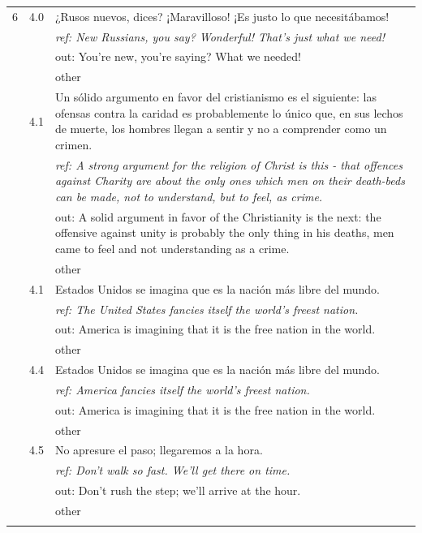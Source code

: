 \begin{longtable}{@{}rp{0.7cm}p{11cm}@{}}
6 & 4.0 & \small ¿Rusos nuevos, dices? ¡Maravilloso! ¡Es justo lo que necesitábamos! \\
& & \small\itshape ref: New Russians, you say? Wonderful! That's just what we need! \\
& & \small\ttfamily out: You're new, you're saying? What we needed! \\
& & \scriptsize other \\\addlinespace
7 & 4.1 & \small Un sólido argumento en favor del cristianismo es el siguiente: las ofensas contra la caridad es probablemente lo único que, en sus lechos de muerte, los hombres llegan a sentir y no a comprender como un crimen. \\
& & \small\itshape ref: A strong argument for the religion of Christ is this - that offences against Charity are about the only ones which men on their death-beds can be made, not to understand, but to feel, as crime. \\
& & \small\ttfamily out: A solid argument in favor of the Christianity is the next: the offensive against unity is probably the only thing in his deaths, men came to feel and not understanding as a crime. \\
& & \scriptsize other \\\addlinespace
8 & 4.1 & \small Estados Unidos se imagina que es la nación más libre del mundo. \\
& & \small\itshape ref: The United States fancies itself the world's freest nation. \\
& & \small\ttfamily out: America is imagining that it is the free nation in the world. \\
& & \scriptsize other \\\addlinespace
9 & 4.4 & \small Estados Unidos se imagina que es la nación más libre del mundo. \\
& & \small\itshape ref: America fancies itself the world's freest nation. \\
& & \small\ttfamily out: America is imagining that it is the free nation in the world. \\
& & \scriptsize other \\\addlinespace
10 & 4.5 & \small No apresure el paso; llegaremos a la hora. \\
& & \small\itshape ref: Don't walk so fast. We'll get there on time. \\
& & \small\ttfamily out: Don't rush the step; we'll arrive at the hour. \\
& & \scriptsize other \\\addlinespace

\end{longtable}
